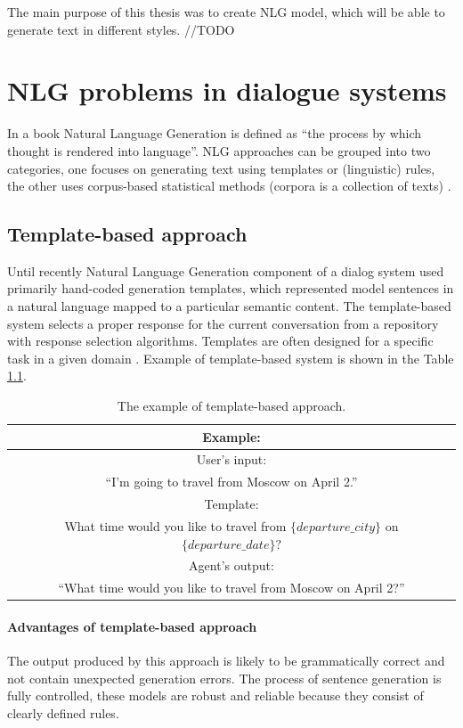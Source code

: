 The main purpose of this thesis was to create NLG model, which will be able to generate text in different styles.  //TODO


\chapter{NLG problems in dialogue systems}\label{nlg_problems}
In a book \cite{alder2017handbook} Natural Language Generation is defined as ``the process by which thought is rendered into language''. NLG approaches can be grouped into two categories, one focuses on generating text using templates or (linguistic) rules, the other uses corpus-based statistical methods (corpora is a collection of texts) \cite{oh2002stochastic}.

\section{Template-based approach} 
Until recently Natural Language Generation component of a dialog system used primarily hand-coded generation templates, which represented model sentences in a natural language mapped to a particular semantic content.
The template-based system selects a proper response for the current conversation from a repository with response selection algorithms. Templates are often designed for a specific task in a given domain \cite{manishina2016data}. 
Example of template-based system is shown in the Table \ref{tab:tb_example}.

  \begin{table}[t]
  \centering
   \begin{tabular}{|c|} 
   \hline
   Example: \\
   \hline
   User's input: \\
   ``I'm going to travel from Moscow on April 2.'' \\ 
   \hline
   Template: \\
   What time would you like to travel from $\{departure\_city\}$ on $\{departure\_date\}?$ \\
   \hline
   Agent's output:\\
   ``What time would you like to travel from Moscow on April 2?'' \\
   \hline
   \end{tabular}
   \caption{The example of template-based approach.}
  \label{tab:tb_example}
  \end{table}

\subsubsection{Advantages of template-based approach}
The output produced by this approach is likely to be grammatically correct and not contain unexpected generation errors. The process of sentence generation is fully controlled, these models are robust and reliable because they consist of clearly defined rules. 


